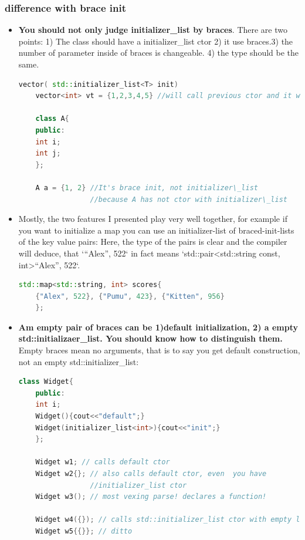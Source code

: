 \documentclass[a4paper,12pt,twoside]{book}
\begin{document}
\subsubsection{difference with brace init}
	\begin{itemize}
		
	\item  \textbf{You should not only judge initializer\_list by braces}. There are two points: 1) The class should have a initializer\_list ctor 2) it use braces.3) the number of parameter inside of braces is changeable. 4) the type should be the same.
	\begin{lstlisting}[frame=single, language=c++,mathescape=true]
	vector( std::initializer_list<T> init)
	vector<int> vt = {1,2,3,4,5} //will call previous ctor and it works. 
	
	class A{
	public:
	int i;
	int j;
	};
	
	A a = {1, 2} //It's brace init, not initializer\_list
	             //because A has not ctor with initializer\_list
	\end{lstlisting}
	
	\item Mostly, the two features I presented play very well together, for example if you want to initialize a map you can use an initializer-list of braced-init-lists of the key value pairs: Here, the type of the pairs is clear and the compiler will deduce, that `{“Alex”, 522}` in fact means `std::pair<std::string const, int>{“Alex”, 522}`.
	
	\begin{lstlisting}[frame=single, language=c++,mathescape=true]
	std::map<std::string, int> scores{ 
	{"Alex", 522}, {"Pumu", 423}, {"Kitten", 956} 
	};
	\end{lstlisting}
	
	\item \textbf{Am empty pair of braces can be 1)default initialization, 2) a empty std::initializaer\_list. You should know how to distinguish them. } Empty braces mean no arguments, that is to say you get default construction, not an empty std::initializer\_list:
	\begin{lstlisting}[frame=single, language=c++,mathescape=true]
		class Widget{
	public:
	int i;
	Widget(){cout<<"default";}
	Widget(initializer_list<int>){cout<<"init";}
	};
	
	Widget w1; // calls default ctor
	Widget w2{}; // also calls default ctor, even  you have 
	             //initializer_list ctor
	Widget w3(); // most vexing parse! declares a function!
	
	Widget w4({}); // calls std::initializer_list ctor with empty list
	Widget w5{{}}; // ditto
	\end{lstlisting}
	
	\end{itemize}
	
\end{document}
